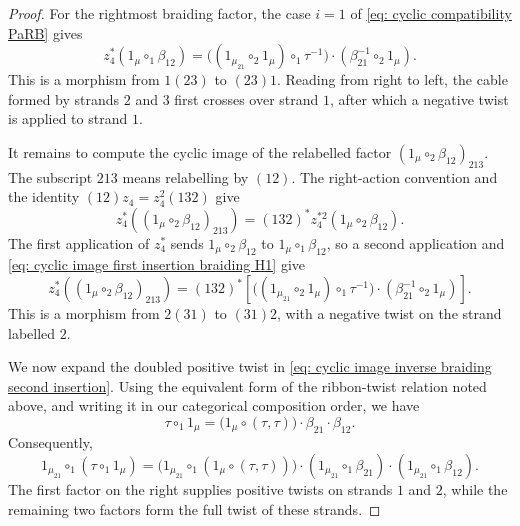 \documentclass{amsart}
\newcommand{\twist}{\tau}
\theoremstyle{definition}
\numberwithin{equation}{section}
\begin{document}
\begin{proof}
For the rightmost braiding factor, the case $i=1$ of
\eqref{eq: cyclic compatibility PaRB} gives
\begin{equation}
\label{eq: cyclic image first insertion braiding H1}
z_4^*(1_\mu\circ_1\beta_{12})
=
\bigl((1_{\mu_{21}}\circ_2 1_\mu)
\circ_1\twist^{-1}\bigr)
\cdot(\beta_{21}^{-1}\circ_2 1_\mu).
\end{equation}
This is a morphism from $1(23)$ to $(23)1$. Reading from right to left, the cable formed by strands $2$ and $3$ first crosses over
strand $1$, after which a negative twist is applied to strand $1$.

It remains to compute the cyclic image of the relabelled factor $(1_\mu\circ_2\beta_{12})_{213}$. The subscript $213$ means relabelling by $(12)$. The right-action convention and the identity $(12)z_4=z_4^2(132)$ give
\[
z_4^*((1_\mu\circ_2\beta_{12})_{213}) = (132)^*z_4^{*2}(1_\mu\circ_2\beta_{12}).
\]
The first application of $z_4^*$ sends $1_\mu\circ_2\beta_{12}$ to $1_\mu\circ_1\beta_{12}$, so a second application and
\eqref{eq: cyclic image first insertion braiding H1} give
\begin{equation}
\label{eq: cyclic image relabelled braiding H1}
z_4^*((1_\mu\circ_2\beta_{12})_{213}) = (132)^*\left[ \bigl((1_{\mu_{21}}\circ_2 1_\mu) \circ_1\twist^{-1}\bigr) \cdot(\beta_{21}^{-1}\circ_2 1_\mu)
\right].
\end{equation}
This is a morphism from $2(31)$ to $(31)2$, with a negative twist on the strand labelled $2$.

We now expand the doubled positive twist in
\eqref{eq: cyclic image inverse braiding second insertion}. Using the
equivalent form of the ribbon-twist relation noted above, and writing
it in our categorical composition order, we have
\begin{equation}
\label{eq: positive ribbon twist expansion H1}
\twist\circ_1 1_\mu = \bigl(1_\mu\circ(\twist,\twist)\bigr) \cdot\beta_{21}\cdot\beta_{12}.
\end{equation}
Consequently,
\begin{equation}
\label{eq: inserted positive ribbon twist expansion H1}
1_{\mu_{21}}\circ_1(\twist\circ_1 1_\mu) = \bigl(1_{\mu_{21}}\circ_1 (1_\mu\circ(\twist,\twist))\bigr) \cdot(1_{\mu_{21}}\circ_1\beta_{21}) \cdot(1_{\mu_{21}}\circ_1\beta_{12}).
\end{equation}
The first factor on the right supplies positive twists on strands $1$ and $2$, while the remaining two factors form the full twist of these strands.


\end{proof}
\end{document}
